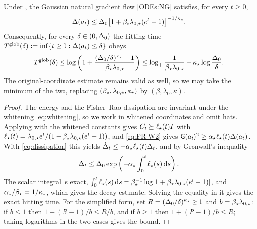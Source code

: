 \begin{theorem}\label{thm:glob-cont}
    Under , the Gaussian natural gradient flow
    \eqref{ODEs:NG} satisfies, for every $t\geq0$,
    \begin{equation*}
        \Delta(a_t)
        \leq
        \Delta_0\bigl[1+\beta_\star\lambda_{0,\star}(e^t-1)\bigr]^{-1/\kappa_\star}.
    \end{equation*}
    Consequently, for every $\delta\in(0,\Delta_0)$ the hitting time
    $T^{\mathrm{glob}}(\delta):=\inf\{t\geq0:\Delta(a_t)\leq\delta\}$ obeys
    \begin{equation*}
        T^{\mathrm{glob}}(\delta)
        \leq
        \log\left(1+\frac{(\Delta_0/\delta)^{\kappa_\star}-1}{\beta_\star\lambda_{0,\star}}\right)
        \leq
        \log_+\frac1{\beta_\star\lambda_{0,\star}}
        +\kappa_\star\log\frac{\Delta_0}{\delta}.
    \end{equation*}
    The original-coordinate estimate remains valid as well, so we may take the minimum of the
    two, replacing $(\beta_\star,\lambda_{0,\star},\kappa_\star)$ by $(\beta,\lambda_0,\kappa)$.
\end{theorem}

\begin{proof}
    The energy and the Fisher--Rao dissipation are invariant under the whitening
    \eqref{eq:whitening}, so we work in whitened coordinates and omit hats. Applying
     with the whitened constants gives
    $C_t\succeq\ell_\star(t)I$ with
    $\ell_\star(t)=\lambda_{0,\star} e^t/(1+\beta_\star\lambda_{0,\star}(e^t-1))$, and \eqref{eq:FR-W2}
    gives $\mathsf{G}(a_t)^2\geq\alpha_\star\ell_\star(t)\Delta(a_t)$. With
    \eqref{eq:dissipation} this yields
    $\dot{\Delta}_t\leq-\alpha_\star\ell_\star(t)\Delta_t$, and by Gronwall's inequality
    \begin{equation*}
        \Delta_t
        \leq
        \Delta_0\exp\left(-\alpha_\star\int_0^t\ell_\star(s)\,\mathrm{d} s\right).
    \end{equation*}
    The scalar integral is exact,
    $\int_0^t\ell_\star(s)\,\mathrm{d} s=\beta_\star^{-1}\log[1+\beta_\star\lambda_{0,\star}(e^t-1)]$, and
    $\alpha_\star/\beta_\star=1/\kappa_\star$, which gives the decay estimate. Solving the equality
    in it gives the exact hitting time. For the simplified form, set
    $R=(\Delta_0/\delta)^{\kappa_\star}\geq1$ and $b=\beta_\star\lambda_{0,\star}$: if $b\leq1$ then
    $1+(R-1)/b\leq R/b$, and if $b\geq1$ then $1+(R-1)/b\leq R$; taking logarithms in the two
    cases gives the bound.
\end{proof}

